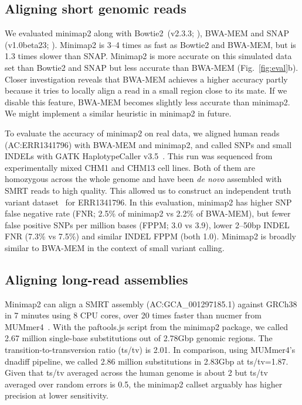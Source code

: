 \documentclass{bioinfo}
\begin{document}
\subsection{Aligning short genomic reads}

We evaluated minimap2 along with Bowtie2~(v2.3.3; \citealt{Langmead:2012fk}), BWA-MEM and
SNAP (v1.0beta23; \citealt{Zaharia:2011aa}). Minimap2 is 3--4 times as fast as Bowtie2 and
BWA-MEM, but is 1.3 times slower than SNAP. Minimap2 is more accurate on this
simulated data set than Bowtie2 and SNAP but less accurate than BWA-MEM
(Fig.~\ref{fig:eval}b). Closer investigation reveals that BWA-MEM achieves
a higher accuracy partly because it tries to locally align a read in a small
region close to its mate. If we disable this feature, BWA-MEM becomes slightly
less accurate than minimap2. We might implement a similar heuristic
in minimap2 in future.

To evaluate the accuracy of minimap2 on real data, we aligned human reads
(AC:ERR1341796) with BWA-MEM and minimap2, and called SNPs and small INDELs
with GATK HaplotypeCaller v3.5~\citep{Depristo:2011vn}. This run was sequenced
from experimentally mixed CHM1 and CHM13 cell lines. Both of them are homozygous
across the whole genome and have been \emph{de novo} assembled with SMRT reads
to high quality. This allowed us to construct an independent truth variant
dataset~\citep{Li223297} for
ERR1341796. In this evaluation, minimap2 has higher SNP false negative rate
(FNR; 2.5\% of minimap2 vs 2.2\% of BWA-MEM), but fewer false positive SNPs per
million bases (FPPM; 3.0 vs 3.9), lower 2--50bp INDEL FNR (7.3\% vs 7.5\%) and
similar INDEL FPPM (both 1.0). Minimap2 is broadly similar to BWA-MEM in the
context of small variant calling.

\subsection{Aligning long-read assemblies}

Minimap2 can align a SMRT assembly (AC:GCA\_001297185.1) against GRCh38 in 7
minutes using 8 CPU cores, over 20 times faster than nucmer from
MUMmer4~\citep{Marcais:2018aa}. With the paftools.js script from the minimap2
package, we called 2.67 million single-base substitutions out of 2.78Gbp
genomic regions. The transition-to-transversion ratio (ts/tv) is 2.01. In
comparison, using MUMmer4's dnadiff pipeline, we called 2.86 million
substitutions in 2.83Gbp at ts/tv=1.87. Given that ts/tv averaged across the
human genome is about 2 but ts/tv averaged over random errors is 0.5, the
minimap2 callset arguably has higher precision at lower sensitivity.
\end{document}
